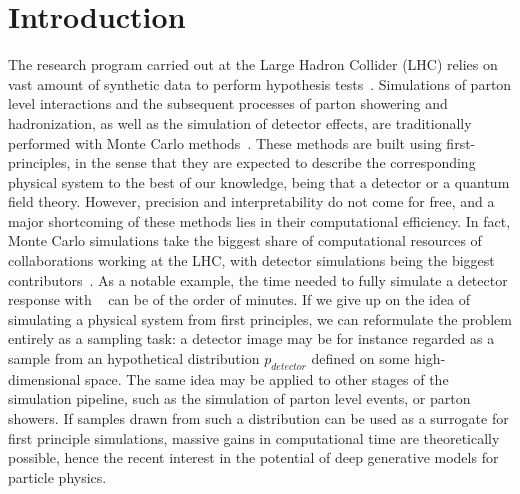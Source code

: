 
\chapter{Introduction}\label{chap:introduction}
\enlargethispage{2ex}
\vspace*{-2pt}

The research program carried out at the Large Hadron Collider (LHC) relies on vast amount of synthetic data to perform hypothesis tests~\cite{Apostolakis:2308666, Aarrestad:2729448, Calafiura:2729668, ATL-SOFT-PUB-2018-002}. Simulations of parton level interactions and the subsequent processes of parton showering and hadronization, as well as the simulation of detector effects, are traditionally performed with Monte Carlo methods~\cite{delphes, madgraph, pythia, Bothmann:2019yzt}. These methods are built using first-principles, in the sense that they are expected to describe the corresponding physical system to the best of our knowledge, being that a detector or a quantum field theory. 
However, precision and interpretability do not come for free, and a major shortcoming of these methods lies in their computational efficiency. In fact, Monte Carlo simulations take the biggest share of computational resources of collaborations working at the LHC, with detector simulations being the biggest contributors~\cite{Calafiura:2729668}. As a notable example, the time needed to fully simulate a detector response with \geant~\cite{AGOSTINELLI2003250} can be of the order of minutes.
If we give up on the idea of simulating a physical system from first principles, we can reformulate the problem entirely as a sampling task: a detector image may be for instance regarded as a sample from an hypothetical distribution $p_{detector}$ defined on some high-dimensional space. The same idea may be applied to other stages of the simulation pipeline, such as the simulation of parton level events, or parton showers.
If samples drawn from such a distribution can be used as a surrogate for first principle simulations, massive gains in computational time are theoretically possible, hence the recent interest in the potential of deep generative models for particle physics\cite{aachen_wgan1, aachen_wgan2, Erdmann:2018kuh, wgan_0, calogan1, calogan2, 2020GANpileup, 2019Lund, DijetGAN1, DijetGAN2, Diefenbacher:2020rna, 2021Getting, ATL-SOFT-PUB-2018-001, 2020iflow1, 2020iflow2, dohi2020variational}. 


